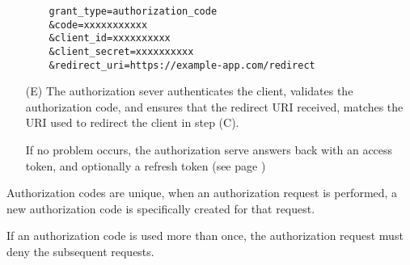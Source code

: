 \begin{enumerate}
\begin{verbatim}
    grant_type=authorization_code
    &code=xxxxxxxxxxx
    &client_id=xxxxxxxxxx
    &client_secret=xxxxxxxxxx
    &redirect_uri=https://example-app.com/redirect
        \end{verbatim}


    \item[(E)]
        The authorization sever authenticates the client, validates the
        authorization code, and ensures that the redirect URI received, matches
        the URI used to redirect the client in step (C).

        If no problem occurs, the authorization serve answers back with an
        access token, and optionally a refresh token (see page
        \pageref{sec:refresh-token})
\end{enumerate}

Authorization codes are unique, when an authorization request is performed, a
new authorization code is specifically created for that request.

If an authorization code is used more than once, the authorization request must
deny the subsequent requests.


